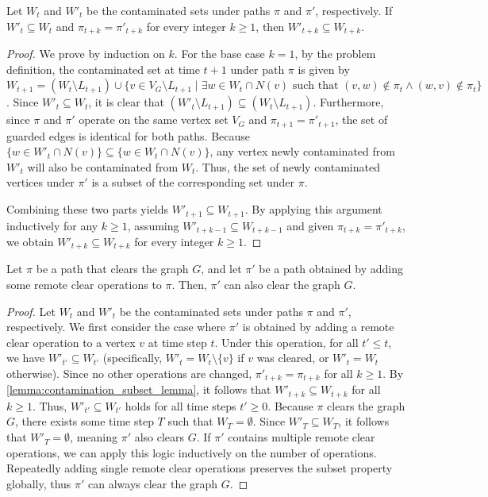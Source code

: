 \documentclass[a4paper,UKenglish,cleveref, autoref, thm-restate]{lipics-v2021}
\begin{document}
\begin{lemma}\label{lemma:contamination_subset_lemma}
Let $W_t$ and $W'_t$ be the contaminated sets under paths $\pi$ and $\pi'$, respectively. If $W'_t \subseteq W_t$ and $\pi_{t+k} = \pi'_{t+k}$ for every integer $k \ge 1$, then $W'_{t+k} \subseteq W_{t+k}$.
\end{lemma}

\begin{proof}
We prove by induction on $k$. For the base case $k=1$, by the problem definition, the contaminated set at time $t+1$ under path $\pi$ is given by $W_{t+1} = (W_t \setminus L_{t+1}) \cup \{v \in V_G \setminus L_{t+1} \mid \exists w \in W_t \cap N(v) \text{ such that } (v, w) \notin \pi_t \land (w, v) \notin \pi_t\}$.
Since $W'_t \subseteq W_t$, it is clear that $(W'_t \setminus L_{t+1}) \subseteq (W_t \setminus L_{t+1})$. 
Furthermore, since $\pi$ and $\pi'$ operate on the same vertex set $V_G$ and $\pi_{t+1} = \pi'_{t+1}$, the set of guarded edges is identical for both paths. Because $\{w \in W'_t \cap N(v)\} \subseteq \{w \in W_t \cap N(v)\}$, any vertex newly contaminated from $W'_t$ will also be contaminated from $W_t$. Thus, the set of newly contaminated vertices under $\pi'$ is a subset of the corresponding set under $\pi$.

Combining these two parts yields $W'_{t+1} \subseteq W_{t+1}$. By applying this argument inductively for any $k \ge 1$, assuming $W'_{t+k-1} \subseteq W_{t+k-1}$ and given $\pi_{t+k} = \pi'_{t+k}$, we obtain $W'_{t+k} \subseteq W_{t+k}$ for every integer $k \ge 1$.
\end{proof}

\begin{lemma}\label{lemma:remote_clear_lemma}
Let $\pi$ be a path that clears the graph $G$, and let $\pi'$ be a path obtained by adding some remote clear operations to $\pi$. Then, $\pi'$ can also clear the graph $G$.
\end{lemma}

\begin{proof}
Let $W_t$ and $W'_t$ be the contaminated sets under paths $\pi$ and $\pi'$, respectively. We first consider the case where $\pi'$ is obtained by adding a remote clear operation to a vertex $v$ at time step $t$. Under this operation, for all $t' \le t$, we have $W'_{t'} \subseteq W_{t'}$ (specifically, $W'_t = W_t \setminus \{v\}$ if $v$ was cleared, or $W'_t = W_t$ otherwise). 
Since no other operations are changed, $\pi'_{t+k} = \pi_{t+k}$ for all $k \ge 1$. By \cref{lemma:contamination_subset_lemma}, it follows that $W'_{t+k} \subseteq W_{t+k}$ for all $k \ge 1$. Thus, $W'_{t'} \subseteq W_{t'}$ holds for all time steps $t' \ge 0$.
Because $\pi$ clears the graph $G$, there exists some time step $T$ such that $W_T = \emptyset$. Since $W'_T \subseteq W_T$, it follows that $W'_T = \emptyset$, meaning $\pi'$ also clears $G$.
If $\pi'$ contains multiple remote clear operations, we can apply this logic inductively on the number of operations. Repeatedly adding single remote clear operations preserves the subset property globally, thus $\pi'$ can always clear the graph $G$.
\end{proof}
\end{document}
